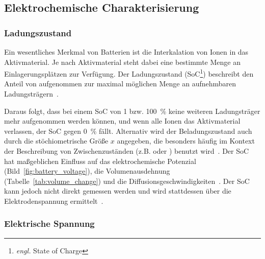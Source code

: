 \subsection{Elektrochemische Charakterisierung}

\subsubsection*{Ladungszustand}
Ein wesentliches Merkmal von Batterien ist die Interkalation von Ionen in das Aktivmaterial. Je nach Aktivmaterial steht dabei eine bestimmte Menge an Einlagerungsplätzen zur Verfügung. Der Ladungszustand (SoC\footnote{\textit{engl.} State of Charge}) beschreibt den Anteil von aufgenommen zur maximal möglichen Menge an aufnehmbaren Ladungsträgern~\cite{Plett2015}.

Daraus folgt, dass bei einem SoC von 1 bzw. 100~\% keine weiteren Ladungsträger mehr aufgenommen werden können, und wenn alle Ionen das Aktivmaterial verlassen, der SoC gegen 0~\% fällt. Alternativ wird der Beladungszustand auch durch die stöchiometrische Größe $x$ angegeben, die besonders häufig im Kontext der Beschreibung von Zwischenzuständen (z.B.  oder ) benutzt wird~\cite{Newman2021}. Der SoC hat maßgeblichen Einfluss auf das elektrochemische Potenzial (Bild~\ref{fig:battery_voltage}), die Volumenausdehnung (Tabelle~\ref{tab:volume_change}) und die Diffusionsgeschwindigkeiten~\cite{Plett2024}. Der SoC kann jedoch nicht direkt gemessen werden und wird stattdessen über die Elektrodenspannung ermittelt~\cite{Newman2021}.



\subsubsection*{Elektrische Spannung}

